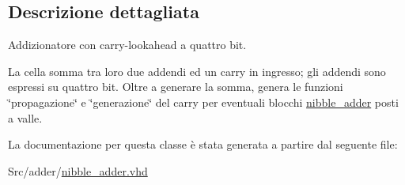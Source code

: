 \subsection{Descrizione dettagliata}
Addizionatore con carry-\/lookahead a quattro bit.

La cella somma tra loro due addendi ed un carry in ingresso; gli addendi sono espressi su quattro bit. Oltre a generare la somma, genera le funzioni \char`\"{}propagazione\char`\"{} e \char`\"{}generazione\char`\"{} del carry per eventuali blocchi \hyperlink{classnibble__adder}{nibble\+\_\+adder} posti a valle. 

La documentazione per questa classe è stata generata a partire dal seguente file\+:\begin{DoxyCompactItemize}
\item 
Src/adder/\hyperlink{nibble__adder_8vhd}{nibble\+\_\+adder.\+vhd}\end{DoxyCompactItemize}

